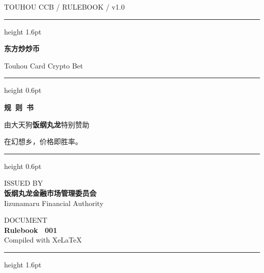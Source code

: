 \documentclass[11pt,a4paper,twoside]{article}
\begin{document}
\begin{titlepage}
  \pagecolor{paper}
  \color{ink}
  \begin{center}
  \vspace*{1.2cm}

  {\sffamily\fontsize{10pt}{12pt}\selectfont \textcolor{soft}{\quad TOUHOU CCB \quad / \quad RULEBOOK \quad / \quad v1.0}}\par
  \vspace{0.4cm}
  {\color{rule}\hrule height 1.6pt}
  \vspace{0.6cm}

  {\sffamily\bfseries\fontsize{42pt}{50pt}\selectfont 东方炒炒币}\par
  \vspace{0.5em}
  {\sffamily\fontsize{16pt}{20pt}\selectfont \textcolor{soft}{Touhou Card Crypto Bet}}\par

  \vspace{0.8cm}
  {\color{rule}\hrule height 0.6pt}
  \vspace{0.6cm}

  {\sffamily\fontsize{14pt}{18pt}\selectfont \textbf{规\ 则\ 书}}\par
  \vspace{0.4em}
  {\kai\fontsize{12pt}{16pt}\selectfont 由大天狗\textcolor{goldAccent}{\textbf{饭纲丸龙}}特别赞助}\par

  \vfill

  {\kai\fontsize{13pt}{18pt}\selectfont 在幻想乡，价格即胜率。}\par

  \vfill
  {\color{rule}\hrule height 0.6pt}
  \vspace{0.4cm}

  \begin{minipage}{0.45\linewidth}\raggedright
    \sffamily\small\textcolor{soft}{ISSUED BY}\\[0.15em]
    \sffamily\textbf{饭纲丸龙金融市场管理委员会}\\
    \sffamily\small\textcolor{soft}{Iizunamaru Financial Authority}
  \end{minipage}\hfill
  \begin{minipage}{0.45\linewidth}\raggedleft
    \sffamily\small\textcolor{soft}{DOCUMENT}\\[0.15em]
    \sffamily\textbf{Rulebook \textnumero\ 001}\\
    \sffamily\small\textcolor{soft}{Compiled with Xe\LaTeX{}}
  \end{minipage}

  \vspace{0.4cm}
  {\color{rule}\hrule height 1.6pt}
  \end{center}
\end{titlepage}
\nopagecolor
\end{document}
